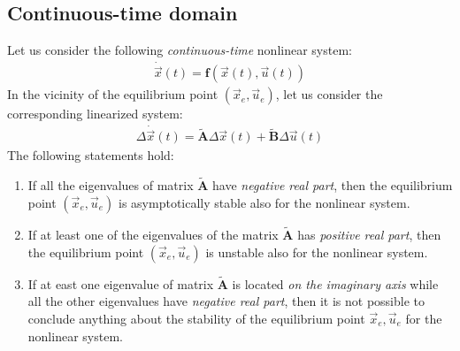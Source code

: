 \documentclass[11pt,a4paper,oneside]{book}
\numberwithin{equation}{section}
\theoremstyle{it}
\theoremstyle{definition}
\begin{document}
\subsection{Continuous-time domain}
Let us consider the following \textit{continuous-time} nonlinear system:
\begin{equation}\label{eqlyap1}
	\begin{aligned}
		\dot{\vec{x}}(t)=\mathbf{f}\left(\vec{x}(t),\vec{u}(t)\right) 
	\end{aligned}
\end{equation}
In the vicinity of the equilibrium point $(\vec{x}_e,\vec{u}_e)$, let us 
consider the corresponding linearized system:
\begin{equation}\label{eqlyap2}
	\begin{aligned}
		\Delta\dot{\vec{x}}(t)=\tilde{\mathbf{A}}\Delta\vec{x}(t)+\tilde{\mathbf{B}}\Delta\vec{u}(t)
	\end{aligned}
\end{equation}
The following statements hold:
\begin{enumerate}
	\item If all the eigenvalues of matrix $\tilde{\mathbf{A}}$ have 
	\textit{negative real part}, then the equilibrium point $\left( \vec{x}_e, 
	\vec{u}_e\right)$ is asymptotically stable also for the nonlinear system.
	\item If at least one of the eigenvalues of the matrix $\tilde{\mathbf{A}}$ 
	has \textit{positive real part}, then the equilibrium point $\left( 
	\vec{x}_e, \vec{u}_e\right)$ is unstable also for the nonlinear system.
	\item If at east one eigenvalue of matrix $\tilde{\mathbf{A}}$ is located 
	\textit{on the imaginary axis} while all the other eigenvalues have 
	\textit{negative real part}, then it is not possible to conclude anything 
	about the stability of the equilibrium point $\vec{x}_e,\vec{u}_e$ for the 
	nonlinear system.
\end{enumerate}
\end{document}
